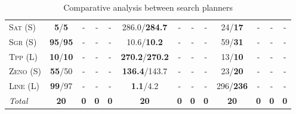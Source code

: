 \documentclass[11pt]{article}
\begin{document}
\begin{table*}[tb]
{\begin{tabular}{|l||cccc||cccc||cccc||}
\textsc{Sat} (S)&\textbf{5}/\textbf{5}&-&-&-&286.0/\textbf{284.7}&-&-&-&24/\textbf{17}&-&-&-\\
\textsc{Sgr} (S)&\textbf{95}/\textbf{95}&-&-&-&10.6/\textbf{10.2}&-&-&-&59/\textbf{31}&-&-&-\\
\textsc{Tpp} (L)&\textbf{10}/\textbf{10}&-&-&-&\textbf{270.2}/\textbf{270.2}&-&-&-&13/\textbf{10}&-&-&-\\
\textsc{Zeno} (S)&\textbf{55}/50&-&-&-&\textbf{136.4}/143.7&-&-&-&23/\textbf{20}&-&-&-\\
\textsc{Line} (L)&\textbf{99}/97&-&-&-&\textbf{1.1}/4.2&-&-&-&296/\textbf{236}&-&-&-
\\\hline
\textit{Total}&\textbf{20}&\textbf{0}&\textbf{0}&\textbf{0}&\textbf{20}&\textbf{0}&\textbf{0}&\textbf{0}&\textbf{20}&\textbf{0}&\textbf{0}&\textbf{0}\\\hline

        \end{tabular}}
        \caption{Comparative analysis between search planners}
        \label{tab:search}
        \end{table*}
        
\end{document}
